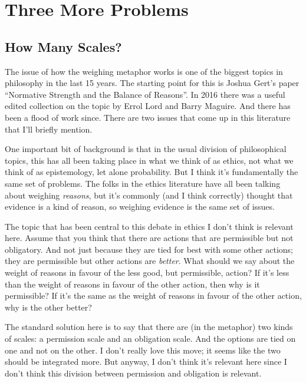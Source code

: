 \documentclass[
  11pt,
  letterpaper,
  DIV=11,
  numbers=noendperiod,
  oneside]{scrartcl}
\begin{document}
\section{Three More Problems}\label{three-more-problems}

\subsection{How Many Scales?}\label{how-many-scales}

The issue of how the weighing metaphor works is one of the biggest
topics in philosophy in the last 15 years. The starting point for this
is Joshua Gert's paper ``Normative Strength and the Balance of
Reasons''. In 2016 there was
a useful edited collection on the topic by Errol Lord and Barry
Maguire. And there has been a flood of work since. There are
two issues that come up in this literature that I'll briefly mention.

One important bit of background is that in the usual division of
philosophical topics, this has all been taking place in what we think of
as ethics, not what we think of as epistemology, let alone probability.
But I think it's fundamentally the same set of problems. The folks in
the ethics literature have all been talking about weighing
\emph{reasons}, but it's commonly (and I think correctly) thought that
evidence is a kind of reason, so weighing evidence is the same set of
issues.

The topic that has been central to this debate in ethics I don't think
is relevant here. Assume that you think that there are actions that are
permissible but not obligatory. And not just because they are tied for
best with some other actions; they are permissible but other actions are
\emph{better}. What should we say about the weight of reasons in favour
of the less good, but permissible, action? If it's less than the weight
of reasons in favour of the other action, then why is it permissible? If
it's the same as the weight of reasons in favour of the other action,
why is the other better?

The standard solution here is to say that there are (in the metaphor)
two kinds of scales: a permission scale and an obligation scale. And the
options are tied on one and not on the other. I don't really love this
move; it seems like the two should be integrated more. But anyway, I
don't think it's relevant here since I don't think this division between
permission and obligation is relevant.
\end{document}
